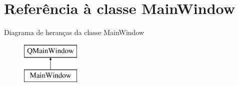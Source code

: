 \hypertarget{class_main_window}{\section{Referência à classe Main\-Window}
\label{class_main_window}
}
Diagrama de heranças da classe Main\-Window\begin{figure}[H]
\begin{center}
\leavevmode
\includegraphics[height=2.000000cm]{class_main_window}
\end{center}
\end{figure}
